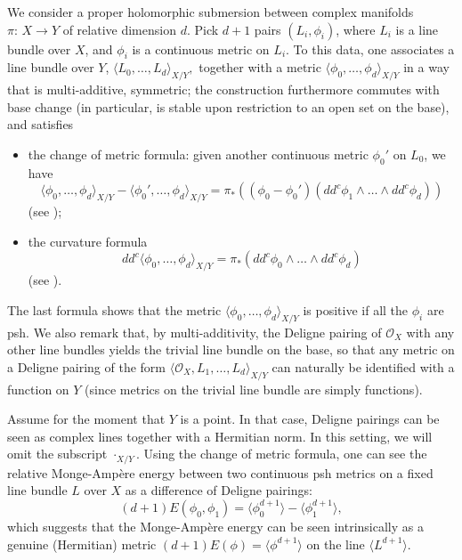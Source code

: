 \documentclass[JEP,XML,SOM,Unicode,NoEqCountersInSection,published]{cedram}
\theoremstyle{definition}
\newcommand\cO{\mathcal{O}}
\begin{document}
We consider a proper holomorphic submersion between complex manifolds~\hbox{$\pi{:}\,X\!\to\! Y$} of relative dimension $d$. Pick $d+1$ pairs $(L_i,\phi_i)$, where $L_i$ is a line bundle over $X$, and $\phi_i$ is a continuous metric on $L_i$. To this data, one associates a line bundle over $Y$, $\langle L_0,\dots,L_d\rangle_{X/Y},$ together with a metric $\langle \phi_0,\dots,\phi_d\rangle_{X/Y}$ in a way that is multi-additive, symmetric; the construction furthermore commutes with base change (in particular, is stable upon restriction to an open set on the base), and satisfies
\begin{itemize}
\item the change of metric formula: given another continuous metric $\phi_0'$ on $L_0$, we have
\begin{equation}\label{eq_changeofmetricformula}
\langle \phi_0,\dots,\phi_d\rangle_{X/Y} - \langle \phi_0',\dots,\phi_d\rangle_{X/Y} = \pi_*\left((\phi_0-\phi_0')(dd^c\phi_1\wedge\dots\wedge dd^c\phi_d)\right)
\end{equation}
(see \cite[Th.\,I.1.1(d)]{elkik2});
\item the curvature formula
\begin{equation}\label{eq_ddc}
dd^c\langle \phi_0,\dots,\phi_d\rangle_{X/Y}=\pi_*(dd^c\phi_0\wedge\dots\wedge dd^c\phi_d)
\end{equation}
(see \cite[Th.\,I.1.1(d)]{elkik2}).
\end{itemize}
The last formula shows that the metric $\langle \phi_0,\dots,\phi_d\rangle_{X/Y}$ is positive if all the $\phi_i$ are psh. We also remark that, by multi-additivity, the Deligne pairing of $\cO_X$ with any other line bundles yields the trivial line bundle on the base, so that any metric on a Deligne pairing of the form $\langle \cO_X,L_1,\dots,L_d\rangle_{X/Y}$ can naturally be identified with a function on $Y$ (since metrics on the trivial line bundle are simply functions).

Assume for the moment that $Y$ is a point. In that case, Deligne pairings can be seen as complex lines together with a Hermitian norm. In this setting, we will omit the subscript $\cdot_{X/Y}$. Using the change of metric formula, one can see the relative Monge-Ampère energy between two continuous psh metrics on a fixed line bundle $L$ over $X$ as a difference of Deligne pairings:
\[
(d+1)E(\phi_0,\phi_1)=\langle \phi_0^{d+1}\rangle-\langle \phi_1^{d+1}\rangle,
\]
which suggests that the Monge-Ampère energy can be seen intrinsically as a genuine (Hermitian) metric $(d+1)E(\phi)=\langle \phi^{d+1}\rangle$ on the line $\langle L^{d+1}\rangle$.
\end{document}

